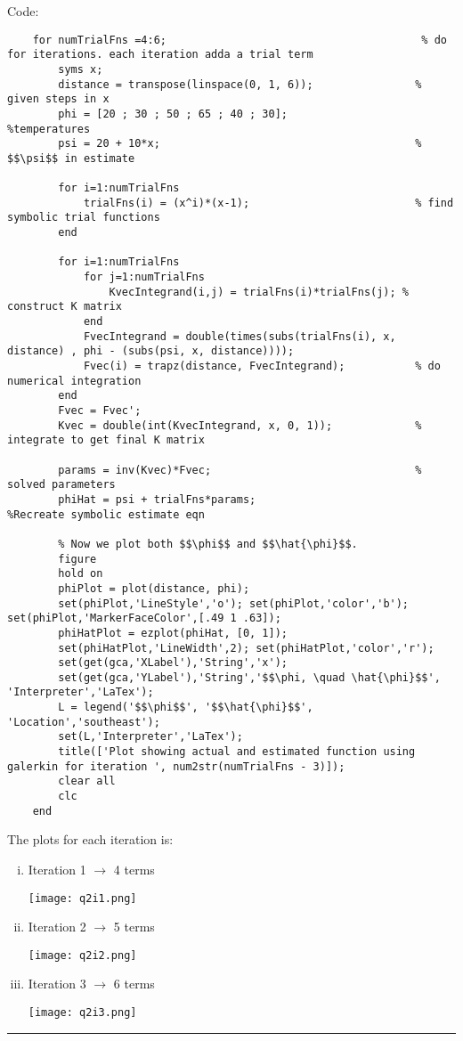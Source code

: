 \documentclass[11pt,paper=a4,answers]{exam}
\begin{document}
\begin{questions}
Code:
\begin{lstlisting}
    for numTrialFns =4:6;                                        % do for iterations. each iteration adda a trial term
        syms x;   
        distance = transpose(linspace(0, 1, 6));                % given steps in x
        phi = [20 ; 30 ; 50 ; 65 ; 40 ; 30];                    %temperatures
        psi = 20 + 10*x;                                        % $$\psi$$ in estimate

        for i=1:numTrialFns
            trialFns(i) = (x^i)*(x-1);                          % find symbolic trial functions
        end

        for i=1:numTrialFns
            for j=1:numTrialFns
                KvecIntegrand(i,j) = trialFns(i)*trialFns(j); % construct K matrix
            end
            FvecIntegrand = double(times(subs(trialFns(i), x, distance) , phi - (subs(psi, x, distance))));
            Fvec(i) = trapz(distance, FvecIntegrand);           % do numerical integration 
        end
        Fvec = Fvec';
        Kvec = double(int(KvecIntegrand, x, 0, 1));             % integrate to get final K matrix

        params = inv(Kvec)*Fvec;                                % solved parameters
        phiHat = psi + trialFns*params;                         %Recreate symbolic estimate eqn

        % Now we plot both $$\phi$$ and $$\hat{\phi}$$.
        figure
        hold on
        phiPlot = plot(distance, phi);
        set(phiPlot,'LineStyle','o'); set(phiPlot,'color','b'); set(phiPlot,'MarkerFaceColor',[.49 1 .63]);
        phiHatPlot = ezplot(phiHat, [0, 1]);
        set(phiHatPlot,'LineWidth',2); set(phiHatPlot,'color','r');
        set(get(gca,'XLabel'),'String','x');
        set(get(gca,'YLabel'),'String','$$\phi, \quad \hat{\phi}$$', 'Interpreter','LaTex');
        L = legend('$$\phi$$', '$$\hat{\phi}$$', 'Location','southeast');
        set(L,'Interpreter','LaTex');
        title(['Plot showing actual and estimated function using galerkin for iteration ', num2str(numTrialFns - 3)]);
        clear all
        clc
    end
\end{lstlisting}
\newpage
The plots for each iteration is:\\
\begin{enumerate}[i.]
    \item Iteration 1 $\longrightarrow $ 4 terms\\
    \centerline{\texttt{[image: q2i1.png]}}
    \item Iteration 2 $\longrightarrow $ 5 terms\\
    \centerline{\texttt{[image: q2i2.png]}}
    \newpage
    \item Iteration 3 $\longrightarrow $ 6 terms\\
    \centerline{\texttt{[image: q2i3.png]}}
\end{enumerate}



\end{questions}
\begin{center}
\rule{.7\textwidth}{1pt}
\end{center}
\end{document}
